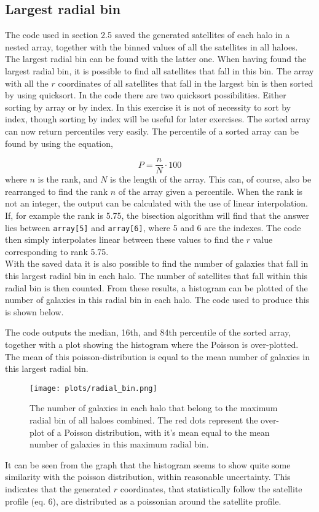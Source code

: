 \subsection{Largest radial bin}

The code used in section 2.5 saved the generated satellites of each halo in a nested array, together with the binned values of all the satellites in all haloes. The largest radial bin can be found with the latter one. When having found the largest radial bin, it is possible to find all satellites that fall in this bin. The array with all the $r$ coordinates of all satellites that fall in the largest bin is then sorted by using quicksort. In the code there are two quicksort possibilities. Either sorting by array or by index. In this exercise it is not of necessity to sort by index, though sorting by index will be useful for later exercises. The sorted array can now return percentiles very easily. The percentile of a sorted array can be found by using the equation,

\begin{equation*}
P = \frac{n}{N}\cdot 100
\end{equation*}
where $n$ is the rank, and $N$ is the length of the array. This can, of course, also be rearranged to find the rank $n$ of the array given a percentile. When the rank is not an integer, the output can be calculated with the use of linear interpolation. If, for example the rank is 5.75, the bisection algorithm will find that the answer lies between \texttt{array[5]} and \texttt{array[6]}, where 5 and 6 are the indexes. The code then simply interpolates linear between these values to find the $r$ value corresponding to rank 5.75.\\
With the saved data it is also possible to find the number of galaxies that fall in this largest radial bin in each halo. The number of satellites that fall within this radial bin is then counted. From these results, a histogram can be plotted of the number of galaxies in this radial bin in each halo. The code used to produce this is shown below.




The code outputs the median, 16th, and 84th percentile of the sorted array, together with a plot showing the histogram where the Poisson is over-plotted. The mean of this poisson-distribution is equal to the mean number of galaxies in this largest radial bin.


\begin{figure}[h]
\centering
\texttt{[image: plots/radial\_bin.png]}
\caption{The number of galaxies in each halo that belong to the maximum radial bin of all haloes combined. The red dots represent the over-plot of a Poisson distribution, with it's mean equal to the mean number of galaxies in this maximum radial bin.}
\end{figure}
It can be seen from the graph that the histogram seems to show quite some similarity with the poisson distribution, within reasonable uncertainty. This indicates that the generated $r$ coordinates, that statistically follow the satellite profile (eq. 6), are distributed as a poissonian around the satellite profile.